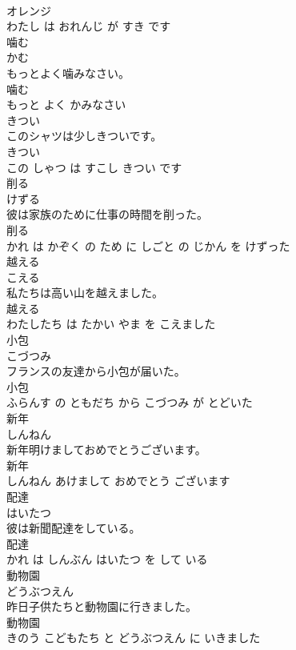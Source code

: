 \documentclass[8pt]{extreport}
\begin{document}
\begin{CJK}{UTF8}{min}
\\	オレンジ 
\\	わたし は おれんじ が すき です			
\\	噛む	
\\	かむ			
\\	もっとよく噛みなさい。	
\\	噛む 
\\	もっと よく かみなさい			
\\	きつい	
\\	このシャツは少しきついです。	
\\	きつい 
\\	この しゃつ は すこし きつい です			
\\	削る	
\\	けずる			
\\	彼は家族のために仕事の時間を削った。	
\\	削る 
\\	かれ は かぞく の ため に しごと の じかん を けずった			
\\	越える	
\\	こえる			
\\	私たちは高い山を越えました。	
\\	越える 
\\	わたしたち は たかい やま を こえました			
\\	小包	
\\	こづつみ			
\\	フランスの友達から小包が届いた。	
\\	小包 
\\	ふらんす の ともだち から こづつみ が とどいた			
\\	新年	
\\	しんねん			
\\	新年明けましておめでとうございます。	
\\	新年 
\\	しんねん あけまして おめでとう ございます			
\\	配達	
\\	はいたつ			
\\	彼は新聞配達をしている。	
\\	配達 
\\	かれ は しんぶん はいたつ を して いる			
\\	動物園	
\\	どうぶつえん			
\\	昨日子供たちと動物園に行きました。	
\\	動物園 
\\	きのう こどもたち と どうぶつえん に いきました			

\end{CJK}
\end{document}
